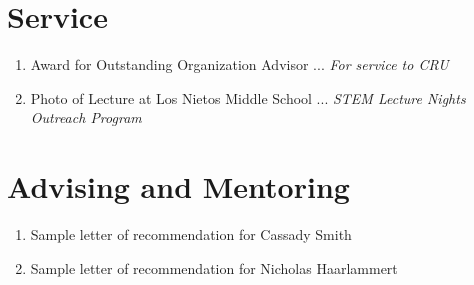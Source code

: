 \documentclass[../../main.tex]{subfiles}
\begin{document}
\section{Service}

\begin{enumerate}
\item Award for Outstanding Organization Advisor ... \textit{For service to CRU}
\item Photo of Lecture at Los Nietos Middle School ... \textit{STEM Lecture Nights Outreach Program}
\end{enumerate}

\section{Advising and Mentoring}

\begin{enumerate}
\item Sample letter of recommendation for Cassady Smith
\item Sample letter of recommendation for Nicholas Haarlammert
\end{enumerate}
\end{document}
